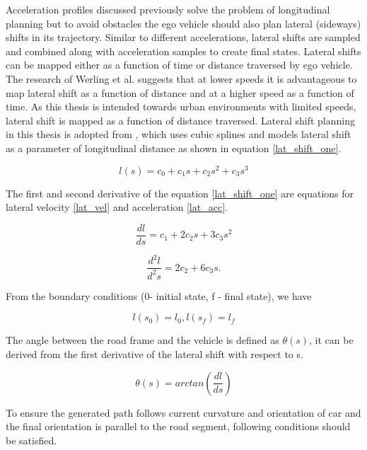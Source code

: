 Acceleration profiles discussed previously solve the problem of longitudinal planning but to avoid obstacles the ego vehicle should also plan lateral (sideways) shifts in its trajectory. Similar to different accelerations, lateral shifts are sampled and combined along with acceleration samples to create final states. Lateral shifts can be mapped either as a function of time or distance traversed by ego vehicle. The research of Werling et al. \cite{werling_frenet} suggests that at lower speeds it is advantageous to map lateral shift as a function of distance and at a higher speed as a function of time. As this thesis is intended towards urban environments with limited speeds, lateral shift is mapped as a function of distance traversed. Lateral shift planning in this thesis is adopted from \cite{real_time_traj_plan_article}, which uses cubic splines and models lateral shift as a parameter of longitudinal distance as shown in equation \ref{lat_shift_one}. 

\begin{equation}
l(s) = c_0 + c_1s + c_2s^2 + c_3s^3
\label{lat_shift_one}
\end{equation}

The first and second derivative of the equation \ref{lat_shift_one} are equations for lateral velocity \ref{lat_vel} and acceleration \ref{lat_acc}.

\begin{equation}
    \frac{dl}{ds} = c_1 + 2c_2s + 3c_3s^2
\label{lat_vel}
\end{equation}


\begin{equation}
    \frac{d^2l}{d^2s} = 2c_2 + 6c_3s.
\label{lat_acc}    
\end{equation}

From the boundary conditions (0- initial state, f - final state), we have

\begin{equation}
l(s_0) = l_0 , l(s_f ) = l_f
\label{lat_boudary}
\end{equation}

The angle between the road frame and the vehicle is defined as $\theta(s)$, it can be derived from the first derivative of the lateral shift with respect to s. 

\begin{equation}
\theta(s) = arctan(\frac{dl}{ds})
\label{lat_veh_theta}
\end{equation}

To ensure the generated path follows current curvature and orientation of car and the final orientation is parallel to the road segment, following conditions should be satisfied.


